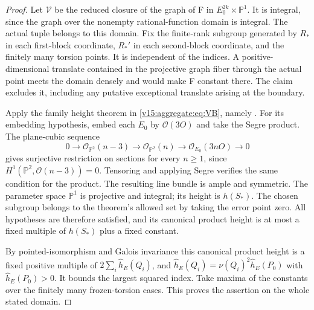\begin{proof}
Let $\mathcal V$ be the reduced closure of the graph of F in
$E_0^{2k}\times\mathbb P^1$. It is integral, since the graph over
the nonempty rational-function domain is integral. The actual tuple
belongs to this domain. Fix the finite-rank subgroup generated by
$R_*$ in each first-block coordinate, $R_*'$ in each second-block
coordinate, and the finitely many torsion points. It is independent
of the indices. A positive-dimensional translate contained in the
projective graph fiber through the actual point meets the domain
densely and would make F constant there. The claim excludes it,
including any putative exceptional translate arising at the boundary.

Apply the family height theorem in
\eqref{v15:aggregate:eq:VB}, namely
\cite[Theorem 1.1, printed p.~308]{v15-aggregate-VonBuhren}.
For its embedding hypothesis, embed each $E_0$ by $\mathcal O(3O)$
and take the Segre product. The plane-cubic sequence
\[
 0\longrightarrow\mathcal O_{\mathbb P^2}(n-3)
 \longrightarrow\mathcal O_{\mathbb P^2}(n)
 \longrightarrow\mathcal O_{E_0}(3nO)\longrightarrow0
\]
gives surjective restriction on sections for every $n\ge1$, since
$H^1(\mathbb P^2,\mathcal O(n-3))=0$.
Tensoring and applying Segre verifies the same condition for the
product. The resulting line bundle is ample and symmetric. The
parameter space $\mathbb P^1$ is projective and integral; its height
is $h(S_*)$. The chosen subgroup belongs to the theorem's allowed
set by taking the error point zero. All hypotheses are therefore
satisfied, and its canonical product height is at most a fixed
multiple of $h(S_*)$ plus a fixed constant.

By pointed-isomorphism and Galois invariance this canonical product
height is a fixed positive multiple of
$2\sum_i\widehat h_E(Q_i)$, and
$\widehat h_E(Q_i)=\nu(Q_i)^2\widehat h_E(P_0)$ with
$\widehat h_E(P_0)>0$. It bounds the largest squared index.
Take maxima of the constants over the finitely many frozen-torsion
cases. This proves the assertion on the whole stated domain.
\end{proof}

